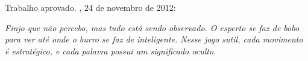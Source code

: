 \documentclass[
	12pt,				%
	openright,			%
	oneside,			%
	a4paper,			%
	english,			%
	french,				%
	spanish,			%
	brazil				%
	]{abntex2}
\begin{document}
%
% 
%
\begin{folhadeaprovacao}

  \begin{center}
    {\ABNTEXchapterfont\large\imprimirautor}

    \vspace*{\fill}\vspace*{\fill}
    \begin{center}
      \ABNTEXchapterfont\bfseries\Large\imprimirtitulo
    \end{center}
    \vspace*{\fill}
    
    \hspace{.45\textwidth}
    \begin{minipage}{.5\textwidth}
        \imprimirpreambulo
    \end{minipage}%
    \vspace*{\fill}
   \end{center}
        
   Trabalho aprovado. \imprimirlocal, 24 de novembro de 2012:

      
   \begin{center}
    \vspace*{0.5cm}
    {\large\imprimirlocal}
    \par
    {\large\imprimirdata}
    \vspace*{1cm}
  \end{center}
  
\end{folhadeaprovacao}

\begin{dedicatoria}
   \vspace*{\fill}
   \centering
   \noindent
   \textit{Finjo que não percebo, mas tudo está sendo observado. O esperto se faz de bobo para ver até onde o burro se faz de inteligente. Nesse jogo sutil, cada movimento é estratégico, e cada palavra possui um significado oculto.} \vspace*{\fill}
\end{dedicatoria}
\end{document}
